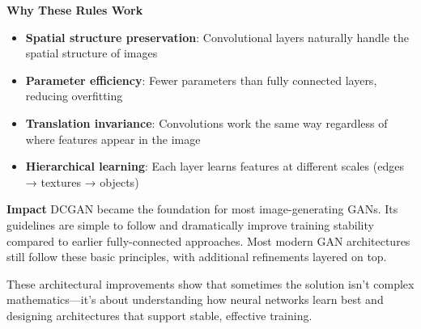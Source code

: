 \textbf{Why These Rules Work}
\begin{itemize}
    \item \textbf{Spatial structure preservation}: Convolutional layers naturally handle the spatial structure of images
    \item \textbf{Parameter efficiency}: Fewer parameters than fully connected layers, reducing overfitting
    \item \textbf{Translation invariance}: Convolutions work the same way regardless of where features appear in the image
    \item \textbf{Hierarchical learning}: Each layer learns features at different scales (edges → textures → objects)
\end{itemize}

\textbf{Impact}
DCGAN became the foundation for most image-generating GANs. Its guidelines are simple to follow and dramatically improve training stability compared to earlier fully-connected approaches. \cite{radford2015unsupervised} Most modern GAN architectures still follow these basic principles, with additional refinements layered on top.

These architectural improvements show that sometimes the solution isn't complex mathematics—it's about understanding how neural networks learn best and designing architectures that support stable, effective training.